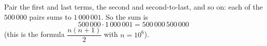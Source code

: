 Pair the first and last terms, the second and second-to-last, and so on: each of the $500\,000$ pairs sums to $1\,000\,001$. So the sum is
\[500\,000\cdot1\,000\,001=\boxed{500\,000\,500\,000}\]
(this is the formula $\dfrac{n(n+1)}{2}$ with $n=10^6$).
